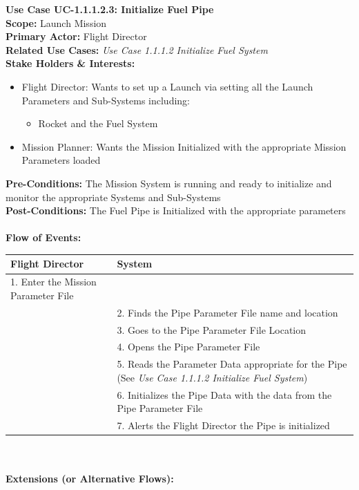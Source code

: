 \documentclass[letterpaper]{article}
\begin{document}
\noindent
\textbf{Use Case UC-1.1.1.2.3:  Initialize Fuel Pipe}\\
\textbf{Scope:}  Launch Mission\\
\textbf{Primary Actor:} Flight Director\\
\textbf{Related Use Cases:} 
\textit{Use Case 1.1.1.2 Initialize Fuel System}\\
\textbf{Stake Holders  \& Interests:}
\begin{itemize}
   \item Flight Director:  Wants to set up a Launch via setting all
      the Launch Parameters and Sub-Systems including:
      \begin{itemize}
         \item Rocket and the Fuel System
      \end{itemize}
   \item Mission Planner:  Wants the Mission Initialized with the
      appropriate Mission Parameters loaded
\end{itemize}
\textbf{Pre-Conditions:  }The Mission System is running and ready to
initialize and monitor the appropriate Systems and Sub-Systems\\
\textbf{Post-Conditions:  }The Fuel Pipe is Initialized with the
appropriate parameters\\\\
\textbf{Flow of Events:}\\
\begin{tabular}{|p{5.75cm}|p{5.75cm}|}\hline
   \textbf{Flight Director}&\textbf{System}\\\hline
   1.  Enter the Mission Parameter File &\\\hline
   &2.  Finds the Pipe Parameter File name and location\\\hline
   &3.  Goes to the Pipe Parameter File Location\\\hline
   &4.  Opens the Pipe Parameter File\\\hline
   &5.  Reads the Parameter Data appropriate for the Pipe (See 
   \textit{Use Case 1.1.1.2 Initialize Fuel System})\\\hline
   &6.  Initializes the Pipe Data with the data from the Pipe 
   Parameter File\\\hline
   &7.   Alerts the Flight Director the Pipe is initialized\\\hline
\end{tabular}\\\\
\textbf{Extensions (or Alternative Flows):}
\end{document}
